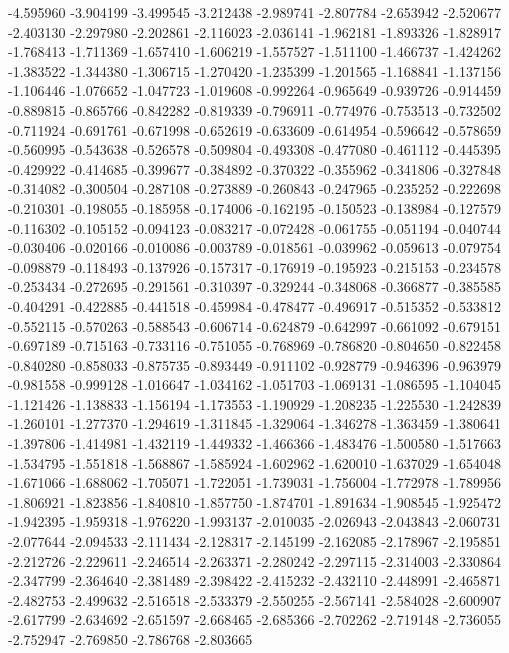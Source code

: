 -4.595960
-3.904199
-3.499545
-3.212438
-2.989741
-2.807784
-2.653942
-2.520677
-2.403130
-2.297980
-2.202861
-2.116023
-2.036141
-1.962181
-1.893326
-1.828917
-1.768413
-1.711369
-1.657410
-1.606219
-1.557527
-1.511100
-1.466737
-1.424262
-1.383522
-1.344380
-1.306715
-1.270420
-1.235399
-1.201565
-1.168841
-1.137156
-1.106446
-1.076652
-1.047723
-1.019608
-0.992264
-0.965649
-0.939726
-0.914459
-0.889815
-0.865766
-0.842282
-0.819339
-0.796911
-0.774976
-0.753513
-0.732502
-0.711924
-0.691761
-0.671998
-0.652619
-0.633609
-0.614954
-0.596642
-0.578659
-0.560995
-0.543638
-0.526578
-0.509804
-0.493308
-0.477080
-0.461112
-0.445395
-0.429922
-0.414685
-0.399677
-0.384892
-0.370322
-0.355962
-0.341806
-0.327848
-0.314082
-0.300504
-0.287108
-0.273889
-0.260843
-0.247965
-0.235252
-0.222698
-0.210301
-0.198055
-0.185958
-0.174006
-0.162195
-0.150523
-0.138984
-0.127579
-0.116302
-0.105152
-0.094123
-0.083217
-0.072428
-0.061755
-0.051194
-0.040744
-0.030406
-0.020166
-0.010086
-0.003789
-0.018561
-0.039962
-0.059613
-0.079754
-0.098879
-0.118493
-0.137926
-0.157317
-0.176919
-0.195923
-0.215153
-0.234578
-0.253434
-0.272695
-0.291561
-0.310397
-0.329244
-0.348068
-0.366877
-0.385585
-0.404291
-0.422885
-0.441518
-0.459984
-0.478477
-0.496917
-0.515352
-0.533812
-0.552115
-0.570263
-0.588543
-0.606714
-0.624879
-0.642997
-0.661092
-0.679151
-0.697189
-0.715163
-0.733116
-0.751055
-0.768969
-0.786820
-0.804650
-0.822458
-0.840280
-0.858033
-0.875735
-0.893449
-0.911102
-0.928779
-0.946396
-0.963979
-0.981558
-0.999128
-1.016647
-1.034162
-1.051703
-1.069131
-1.086595
-1.104045
-1.121426
-1.138833
-1.156194
-1.173553
-1.190929
-1.208235
-1.225530
-1.242839
-1.260101
-1.277370
-1.294619
-1.311845
-1.329064
-1.346278
-1.363459
-1.380641
-1.397806
-1.414981
-1.432119
-1.449332
-1.466366
-1.483476
-1.500580
-1.517663
-1.534795
-1.551818
-1.568867
-1.585924
-1.602962
-1.620010
-1.637029
-1.654048
-1.671066
-1.688062
-1.705071
-1.722051
-1.739031
-1.756004
-1.772978
-1.789956
-1.806921
-1.823856
-1.840810
-1.857750
-1.874701
-1.891634
-1.908545
-1.925472
-1.942395
-1.959318
-1.976220
-1.993137
-2.010035
-2.026943
-2.043843
-2.060731
-2.077644
-2.094533
-2.111434
-2.128317
-2.145199
-2.162085
-2.178967
-2.195851
-2.212726
-2.229611
-2.246514
-2.263371
-2.280242
-2.297115
-2.314003
-2.330864
-2.347799
-2.364640
-2.381489
-2.398422
-2.415232
-2.432110
-2.448991
-2.465871
-2.482753
-2.499632
-2.516518
-2.533379
-2.550255
-2.567141
-2.584028
-2.600907
-2.617799
-2.634692
-2.651597
-2.668465
-2.685366
-2.702262
-2.719148
-2.736055
-2.752947
-2.769850
-2.786768
-2.803665
